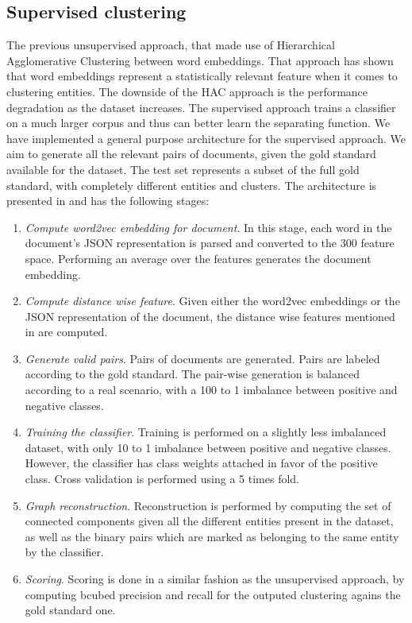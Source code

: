 \subsection {Supervised clustering}

The previous unsupervised approach, that made use of Hierarchical Agglomerative
Clustering between word embeddings. That approach has shown that word embeddings
represent a statistically relevant feature when it comes to clustering entities.
The downside of the HAC approach is the performance degradation as the dataset
increases. The supervised approach trains a classifier on a much larger corpus
and thus can better learn the separating function.
We have implemented a general purpose architecture for the supervised approach.
We aim to generate all the relevant pairs of documents, given the gold standard
available for the dataset. The test set represents a subset of the full gold
standard, with completely different entities and clusters. The architecture
is presented in  and has the following
stages:


\begin {enumerate}
\item
  {\em Compute word2vec embedding for document}. In this stage, each word in the
  document's JSON representation is parsed and converted to the 300 feature space.
  Performing an average over the features generates the document embedding.
\item
  {\em Compute distance wise feature}. Given either the word2vec embeddings or
  the JSON representation of the document, the distance wise features mentioned
  in  are computed.
\item
  {\em Generate valid pairs}. Pairs of documents are generated. Pairs are
  labeled according to the gold standard. The pair-wise generation is balanced
  according to a real scenario, with a 100 to 1 imbalance between positive
  and negative classes.
\item
  {\em Training the classifier}. Training is performed on a slightly less
  imbalanced dataset, with only 10 to 1 imbalance between positive and negative
  classes. However, the classifier has class weights attached in favor
  of the positive class. Cross validation is performed using a 5 times fold.
\item
  {\em Graph reconstruction}. Reconstruction is performed by computing the
  set of connected components given all the different entities present in the
  dataset, as well as the binary pairs which are marked as belonging to the same
  entity by the classifier.
\item
  {\em Scoring}. Scoring is done in a similar fashion as the unsupervised approach,
  by computing bcubed precision and recall for the outputed clustering agains the
  gold standard one.
\end {enumerate}

